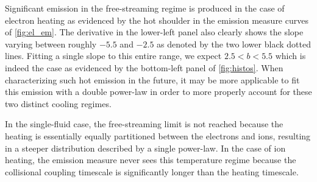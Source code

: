 \documentclass[apj]{emulateapj}
\begin{document}
	\par Significant emission in the free-streaming regime is produced in the case of electron heating as evidenced by the hot shoulder in the emission measure curves of \autoref{fig:el_em}. The derivative in the lower-left panel also clearly shows the slope varying between roughly $-5.5$ and $-2.5$ as denoted by the two lower black dotted lines. Fitting a single slope to this entire range, we expect $2.5<b<5.5$ which is indeed the case as evidenced by the bottom-left panel of \autoref{fig:histos}. When characterizing such hot emission in the future, it may be more applicable to fit this emission with a double power-law in order to more properly account for these two distinct cooling regimes.
	\par In the single-fluid case, the free-streaming limit is not reached because the heating is essentially equally partitioned between the electrons and ions, resulting in a steeper distribution described by a single power-law. In the case of ion heating, the emission measure never sees this temperature regime because the collisional coupling timescale is significantly longer than the heating timescale. 
\end{document}
